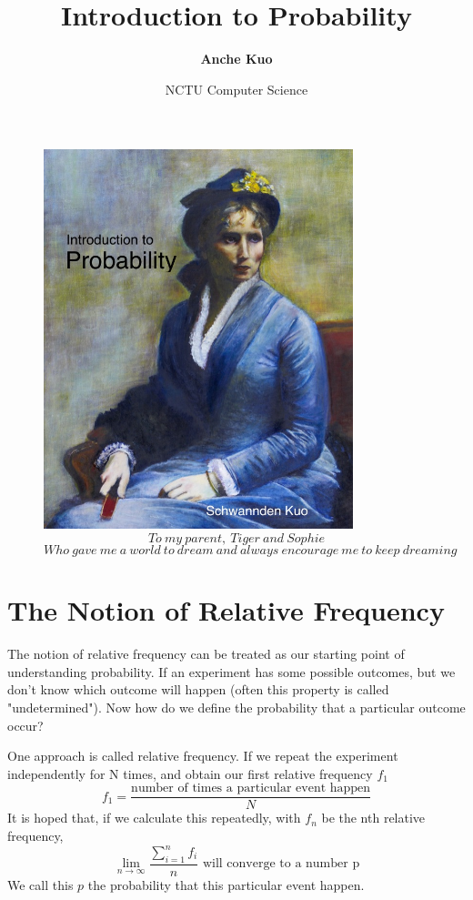 \documentclass[a4paper,12pt]{article}
\title{\textbf{Introduction to Probability}}
\author{\textbf{Anche Kuo}}
\date{NCTU Computer Science}
\begin{document}
\maketitle

\begin{figure}[ht!]
\centering
\includegraphics[width=90mm]{charlotteDubourg.jpg}
\\
$$To\ my\ parent,\ Tiger\ and\ Sophie$$
$$Who\ gave\ me\ a\ world\ to\ dream\ and\ always\ encourage\ me\ to\ keep\ dreaming$$
\label{overflow}
\end{figure}

\newpage
\tableofcontents

\newpage
\section{The Notion of Relative Frequency}
The notion of relative frequency can be treated as our starting point of understanding probability. If an experiment has some possible outcomes, but we don't know which outcome will happen (often this property is called "undetermined"). Now how do we define the probability that a particular outcome occur?

One approach is called relative frequency. If we repeat the experiment independently for N times, and obtain our first relative frequency $f_1$ $$f_1 = \frac{\text{number of times a particular event happen}}{N}$$It is hoped that, if we calculate this repeatedly, with $f_n$ be the nth relative frequency,$$\lim_{n\to\infty}\frac{\sum_{i=1}^n f_i}{n} \text{ will converge to a number p}$$We call this $p$ the probability that this particular event happen.
\end{document}
